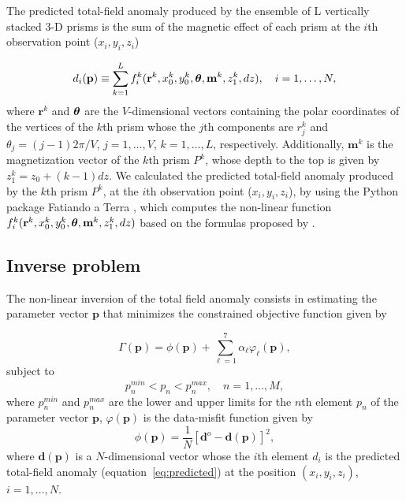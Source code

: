 The predicted total-field anomaly produced by the ensemble of L vertically stacked 3-D prisms is the sum of the magnetic effect of each prism at the $i$th observation point ($x_i, y_i, z_i$)

\begin{equation}\label{eq:predicted}
d_i (\mathbf{p}) \equiv \sum\limits_{k=1}^L f_i^k(\mathbf{r}^k, x_0^k, y_0^k,\mbox{\boldmath$\theta$}, \mathbf{m}^k, z^k_1, dz), \quad i=1,\dots,N,
\end{equation}
where $\mathbf{r}^k$ and $\mbox{\boldmath$\theta$}$ are the $V$-dimensional vectors containing the polar coordinates of the vertices of the $k$th prism whose the $j$th components are $r^k_j$ and $\theta_j = (j-1)2\pi/V$, $j=1,\dots , V$, $k=1,\dots ,L$, respectively. Additionally, $\mathbf{m}^k$ is the magnetization vector of the $k$th prism $P^k$, whose depth to the top is given by $z_1^k = z_0 + (k-1)dz$. We calculated the predicted total-field anomaly produced by the $k$th prism $P^k$, at the $i$th observation point ($x_i, y_i, z_i$), by using the Python package Fatiando a Terra \citep{uieda-etal2013}, which computes the non-linear function $f_i^k(\mathbf{r}^k, x_0^k, y_0^k,\mbox{\boldmath$\theta$}, \mathbf{m}^k, z^k_1, dz)$ based on the formulas proposed by \cite{plouff1976}.

\subsection{Inverse problem}

The non-linear inversion of the total field anomaly consists in estimating the parameter vector $\mathbf{p}$ that minimizes the constrained objective function given by

\begin{equation}
\Gamma (\mathbf{p}) = \phi (\mathbf{p}) + \sum\limits^{7}_{\ell =1}\alpha_{\ell}\varphi_{\ell}(\mathbf{p}),
\label{eq:gamma}
\end{equation}
subject to
\begin{equation}\label{eq:desigualdade}
p_{n }^{min} < p_n < p_n^{max},\quad n =1, \dots, M,
\end{equation}
where $p_{n }^{min}$ and $p_n^{max}$ are the lower and upper limits for the $n$th element $p_n$ of the parameter vector $\mathbf{p}$, $\varphi (\mathbf{p})$ is the data-misfit function given by
\begin{equation}\label{eq:misfit}
\phi (\mathbf{p}) = \frac{1}{N}[\mathbf{d}^{o} - \mathbf{d}(\mathbf{p})]^2,
\end{equation}
where $\mathbf{d}(\mathbf{p})$ is a $N$-dimensional vector whose the $i$th element $d_i$ is the predicted total-field anomaly (equation~\ref{eq:predicted}) at the position $(x_i,y_i,z_i)$, $i = 1,\dots, N$.

